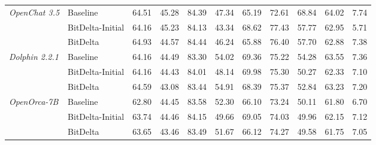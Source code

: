 \documentclass[numbers]{article}
\begin{document}
\begin{table}[htbp]
{\begin{tabular}{@{}llccccccccc@{}}
        \midrule
        \multirow{3}{*}{\textit{OpenChat 3.5}} & Baseline & 64.51 & 45.28 & 84.39 & 47.34 & 65.19 & 72.61 & 68.84 & 64.02 & 7.74 \\
        & BitDelta-Initial & 64.16 & 45.23 & 84.13 & 43.34 & 68.62 & 77.43 & 57.77 & 62.95 & 5.71 \\
        & BitDelta & 64.93 & 44.57 & 84.44 & 46.24 & 65.88 & 76.40 & 57.70 & 62.88 & 7.38 \\

        \midrule
        \multirow{3}{*}{\textit{Dolphin 2.2.1}} & Baseline & 64.16 & 44.49 & 83.30 & 54.02 & 69.36 & 75.22 & 54.28 & 63.55 & 7.36 \\
        & BitDelta-Initial & 64.16 & 44.43 & 84.01 & 48.14 & 69.98 & 75.30 & 50.27 & 62.33 & 7.10 \\
        & BitDelta & 64.59 & 43.08 & 83.44 & 54.91 & 68.39 & 75.37 & 52.84 & 63.23 & 7.20 \\

        \midrule
        \multirow{3}{*}{\textit{OpenOrca-7B}} & Baseline & 62.80 & 44.45 & 83.58 & 52.30 & 66.10 & 73.24 & 50.11 & 61.80 & 6.70 \\
        & BitDelta-Initial & 63.74 & 44.46 & 84.15 & 49.66 & 69.05 & 74.03 & 49.96 & 62.15 & 7.12 \\
        & BitDelta & 63.65 & 43.46 & 83.49 & 51.67 & 66.12 & 74.27 & 49.58 & 61.75 & 7.05 \\
        
        \bottomrule
        
    \end{tabular}
    }
\end{table}
\end{document}
